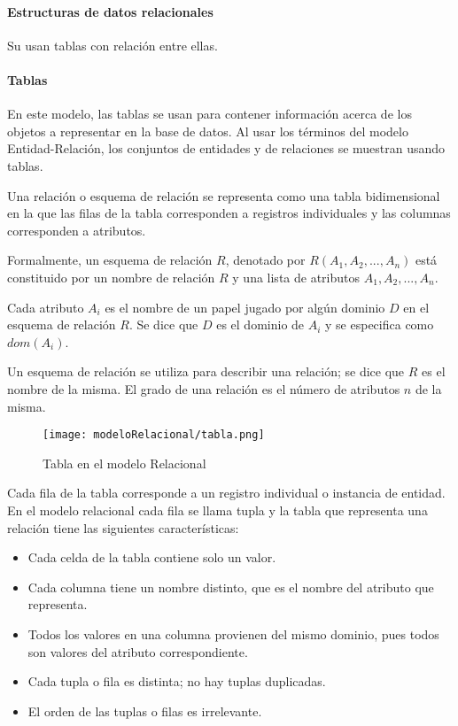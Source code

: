 \paragraph*{Estructuras de datos relacionales}
Su usan tablas con relación entre ellas.
\paragraph*{Tablas}
En este modelo, las tablas se usan para contener información acerca de los objetos a representar en la base de datos. Al usar los términos del modelo Entidad-Relación, los conjuntos de entidades y de relaciones se muestran usando tablas.


Una relación o esquema de relación se representa como una tabla bidimensional en la que las filas de la tabla corresponden a registros individuales y las columnas corresponden a atributos.

Formalmente, un esquema de relación $R$, denotado por $R(A_1, A_2,..., A_n)$ está constituido por un nombre de relación $R$ y una lista de atributos $A_1, A_2,..., A_n$. 


Cada atributo $A_i$ es el nombre de un papel jugado por algún dominio $D$ en el esquema de relación $R$. Se dice que $D$ es el dominio de $A_i$ y se especifica como $dom(A_i)$. 


Un esquema de relación se utiliza para describir una relación; se dice que $R$ es el nombre de la misma. El grado de una relación es el número de atributos $n$ de la misma.


\begin{figure}[ht]
    \centering
    \texttt{[image: modeloRelacional/tabla.png]}
    \caption{Tabla en el modelo Relacional}
    \label{img:modeloRelacional-Tabla}
\end{figure} 
Cada fila de la tabla corresponde a un registro individual o instancia de entidad. En el modelo relacional cada fila se llama tupla y la tabla que representa una relación tiene las siguientes características:
\begin{itemize}
    \item Cada celda de la tabla contiene solo un valor.
    \item Cada columna tiene un nombre distinto, que es el nombre del atributo que representa.
    \item Todos los valores en una columna provienen del mismo dominio, pues todos son valores del atributo correspondiente.
    \item Cada tupla o fila es distinta; no hay tuplas duplicadas.
    \item El orden de las tuplas o filas es irrelevante.
\end{itemize}
